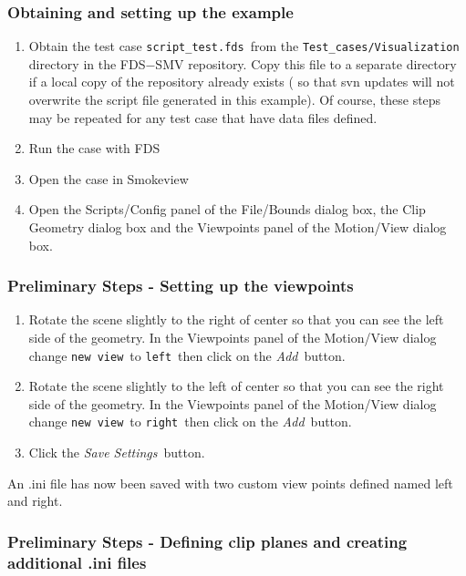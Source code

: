 \documentclass[11pt,twoside]{book}
\begin{document}
\subsubsection{Obtaining and setting up the example}

\begin{enumerate}
\item Obtain the test case {\tt script\_test.fds}\ from the
    {\tt Test\_cases/Visualization} directory in
the FDS$-$SMV repository.  Copy this file to a separate directory
 if a local copy of the repository already exists
 ( so that svn updates will not overwrite the script file generated in this example).  Of course, these steps may be repeated
 for any test case that have data files defined.
\item Run the case with FDS
\item Open the case in Smokeview
\item Open the Scripts/Config panel of the File/Bounds dialog box,
the Clip Geometry dialog box and the Viewpoints panel of the Motion/View
dialog box.
\end{enumerate}

\subsubsection{Preliminary Steps - Setting up the viewpoints}

\begin{enumerate}
\item Rotate the scene slightly to the right of center so that you can see the left side of the geometry.  In the Viewpoints panel of the Motion/View dialog change {\tt new view}\ to {\tt left}\
    then click on the {\em Add}\ button.
\item Rotate the scene slightly to the left of center so that you can see the right side of the geometry.  In the Viewpoints panel of the Motion/View dialog change {\tt new view}\ to {\tt right}\
    then click on the {\em Add}\ button.
\item Click the {\em Save Settings}\ button.
\end{enumerate}

An .ini file has now been saved with two custom view points defined named left and right.

\subsubsection{Preliminary Steps - Defining clip planes and creating additional .ini files}
\end{document}
